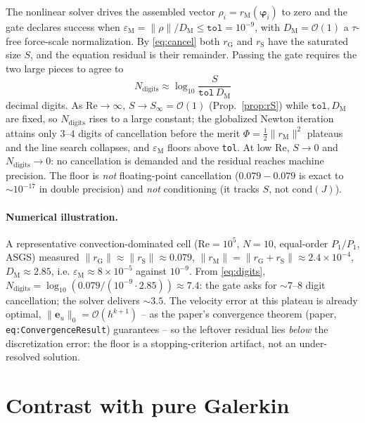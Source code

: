 \documentclass[11pt]{article}
\newcommand{\Reyn}{\mathrm{Re}}
\newcommand{\rG}{r_{\mathrm{G}}}
\newcommand{\rS}{r_{\mathrm{S}}}
\newcommand{\rM}{r_{\mathrm{M}}}
\newcommand{\bigOh}{\mathcal{O}}
\begin{document}
The nonlinear solver drives the assembled vector $\rho_i=\rM(\boldsymbol\varphi_i)$
to zero and the gate declares success when
$\varepsilon_{\mathrm M}=\|\rho\|/D_{\mathrm M}\le\texttt{tol}=10^{-9}$, with
$D_{\mathrm M}=\bigOh(1)$ a $\tau$-free force-scale normalization. By
\eqref{eq:cancel} both $\rG$ and $\rS$ have the saturated size $S$, and the
equation residual is their remainder. Passing the gate requires the two large
pieces to agree to
\begin{equation}
  N_{\mathrm{digits}}\approx\log_{10}\frac{S}{\texttt{tol}\,D_{\mathrm M}}
  \label{eq:digits}
\end{equation}
decimal digits. As $\Reyn\to\infty$, $S\to S_\infty=\bigOh(1)$
(Prop.~\ref{prop:rS}) while $\texttt{tol},D_{\mathrm M}$ are fixed, so
$N_{\mathrm{digits}}$ rises to a large constant; the globalized Newton iteration
attains only $3$--$4$ digits of cancellation before the merit
$\Phi=\tfrac12\|\rM\|^2$ plateaus and the line search collapses, and
$\varepsilon_{\mathrm M}$ floors above \texttt{tol}. At low $\Reyn$, $S\to0$ and
$N_{\mathrm{digits}}\to0$: no cancellation is demanded and the residual reaches
machine precision. The floor is \emph{not} floating-point cancellation
($0.079-0.079$ is exact to $\sim10^{-17}$ in double precision) and \emph{not}
conditioning (it tracks $S$, not $\mathrm{cond}(J)$).

\paragraph{Numerical illustration.}
A representative convection-dominated cell ($\Reyn=10^5$, $N=10$, equal-order
$P_1/P_1$, ASGS) measured
$\|\rG\|\approx\|\rS\|\approx0.079$,
$\|\rM\|=\|\rG+\rS\|\approx2.4\times10^{-4}$,
$D_{\mathrm M}\approx2.85$, i.e. $\varepsilon_{\mathrm M}\approx8\times10^{-5}$
against $10^{-9}$. From \eqref{eq:digits},
$N_{\mathrm{digits}}=\log_{10}(0.079/(10^{-9}\!\cdot\!2.85))\approx7.4$: the gate
asks for $\sim7$--$8$ digit cancellation; the solver delivers $\sim3.5$. The
velocity error at this plateau is already optimal, $\|\boldsymbol e_u\|_0
=\bigOh(h^{k+1})$ -- as the paper's convergence theorem (paper,
\texttt{eq:ConvergenceResult}) guarantees -- so the leftover residual lies
\emph{below} the discretization error: the floor is a stopping-criterion
artifact, not an under-resolved solution.

\section{Contrast with pure Galerkin}\label{sec:galerkin}
\end{document}

